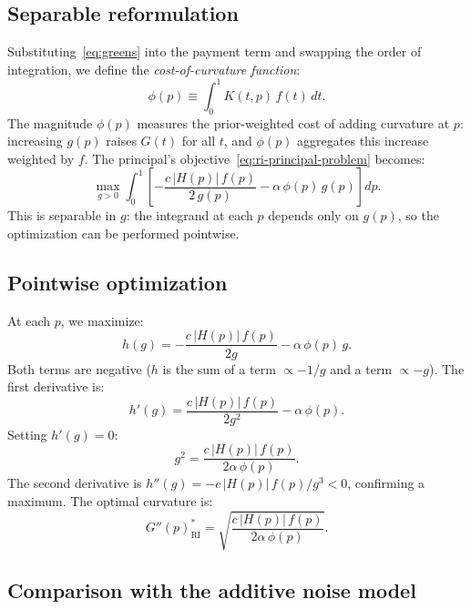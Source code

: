 \documentclass[11pt]{article}
\begin{document}
\subsection{Separable reformulation}

Substituting~\eqref{eq:greens} into the payment term and swapping the order of integration, we define the \emph{cost-of-curvature function}:
\begin{equation}\label{eq:phi-def}
\phi(p) \equiv \int_0^1 K(t,p)\,f(t)\,dt.
\end{equation}
The magnitude $\phi(p)$ measures the prior-weighted cost of adding curvature at $p$: increasing $g(p)$ raises $G(t)$ for all $t$, and $\phi(p)$ aggregates this increase weighted by $f$. The principal's objective~\eqref{eq:ri-principal-problem} becomes:
\begin{equation}\label{eq:ri-objective}
\max_{g > 0} \int_0^1 \left[-\frac{c\,|H(p)|\,f(p)}{2\,g(p)} - \alpha\,\phi(p)\,g(p)\right] dp.
\end{equation}
This is separable in $g$: the integrand at each $p$ depends only on $g(p)$, so the optimization can be performed pointwise.

\subsection{Pointwise optimization}

At each $p$, we maximize:
\[
h(g) = -\frac{c\,|H(p)|\,f(p)}{2g} - \alpha\,\phi(p)\,g.
\]
Both terms are negative ($h$ is the sum of a term $\propto -1/g$ and a term $\propto -g$). The first derivative is:
\[
h'(g) = \frac{c\,|H(p)|\,f(p)}{2g^2} - \alpha\,\phi(p).
\]
Setting $h'(g) = 0$:
\[
g^2 = \frac{c\,|H(p)|\,f(p)}{2\alpha\,\phi(p)}.
\]
The second derivative is $h''(g) = -c\,|H(p)|\,f(p)/g^3 < 0$, confirming a maximum. The optimal curvature is:
\begin{equation}\label{eq:ri-optimal-curvature}
\boxed{G''(p)^*_{\mathrm{RI}} = \sqrt{\frac{c\,|H(p)|\,f(p)}{2\alpha\,\phi(p)}}.}
\end{equation}

\subsection{Comparison with the additive noise model}
\end{document}
